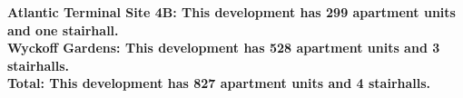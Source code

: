 \bf{Atlantic Terminal Site 4B}: This development has 299 apartment units and one stairhall.\\\bf{Wyckoff Gardens}: This development has 528 apartment units and 3 stairhalls.\\\bf{Total}: This development has 827 apartment units and 4 stairhalls.\\